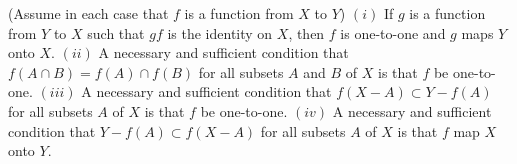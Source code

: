 \begin{exercise} (Assume in each case that $f$ is a function from $X$ to $Y$) $(i)$ If $g$ is a function from $Y$ to $X$ such that $gf$ is the identity on $X$, then $f$ is one-to-one and $g$ maps $Y$ onto $X$. $(ii)$ A necessary and sufficient condition that $f(A \cap B) = f(A) \cap f(B)$ for all subsets $A$ and $B$ of $X$ is that $f$ be one-to-one. $(iii)$ A necessary and sufficient condition that $f(X - A) \subset Y - f(A)$ for all subsets $A$ of $X$ is that $f$ be one-to-one. $(iv)$ A necessary and sufficient condition that $Y - f(A) \subset f(X - A)$ for all subsets $A$ of $X$ is that $f$ map $X$ onto $Y$.
\end{exercise}